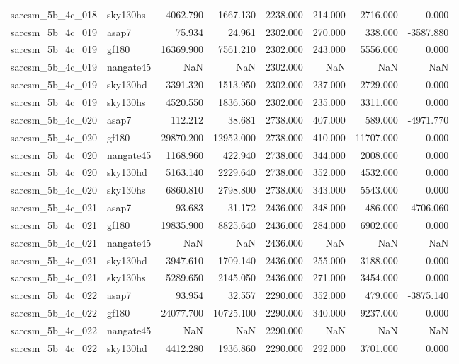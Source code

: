 \begin{tabular}{llrrrrrr}
sarcsm\_5b\_4c\_018 & sky130hs & 4062.790 & 1667.130 & 2238.000 & 214.000 & 2716.000 & 0.000 \\
sarcsm\_5b\_4c\_019 & asap7 & 75.934 & 24.961 & 2302.000 & 270.000 & 338.000 & -3587.880 \\
sarcsm\_5b\_4c\_019 & gf180 & 16369.900 & 7561.210 & 2302.000 & 243.000 & 5556.000 & 0.000 \\
sarcsm\_5b\_4c\_019 & nangate45 & NaN & NaN & 2302.000 & NaN & NaN & NaN \\
sarcsm\_5b\_4c\_019 & sky130hd & 3391.320 & 1513.950 & 2302.000 & 237.000 & 2729.000 & 0.000 \\
sarcsm\_5b\_4c\_019 & sky130hs & 4520.550 & 1836.560 & 2302.000 & 235.000 & 3311.000 & 0.000 \\
sarcsm\_5b\_4c\_020 & asap7 & 112.212 & 38.681 & 2738.000 & 407.000 & 589.000 & -4971.770 \\
sarcsm\_5b\_4c\_020 & gf180 & 29870.200 & 12952.000 & 2738.000 & 410.000 & 11707.000 & 0.000 \\
sarcsm\_5b\_4c\_020 & nangate45 & 1168.960 & 422.940 & 2738.000 & 344.000 & 2008.000 & 0.000 \\
sarcsm\_5b\_4c\_020 & sky130hd & 5163.140 & 2229.640 & 2738.000 & 352.000 & 4532.000 & 0.000 \\
sarcsm\_5b\_4c\_020 & sky130hs & 6860.810 & 2798.800 & 2738.000 & 343.000 & 5543.000 & 0.000 \\
sarcsm\_5b\_4c\_021 & asap7 & 93.683 & 31.172 & 2436.000 & 348.000 & 486.000 & -4706.060 \\
sarcsm\_5b\_4c\_021 & gf180 & 19835.900 & 8825.640 & 2436.000 & 284.000 & 6902.000 & 0.000 \\
sarcsm\_5b\_4c\_021 & nangate45 & NaN & NaN & 2436.000 & NaN & NaN & NaN \\
sarcsm\_5b\_4c\_021 & sky130hd & 3947.610 & 1709.140 & 2436.000 & 255.000 & 3188.000 & 0.000 \\
sarcsm\_5b\_4c\_021 & sky130hs & 5289.650 & 2145.050 & 2436.000 & 271.000 & 3454.000 & 0.000 \\
sarcsm\_5b\_4c\_022 & asap7 & 93.954 & 32.557 & 2290.000 & 352.000 & 479.000 & -3875.140 \\
sarcsm\_5b\_4c\_022 & gf180 & 24077.700 & 10725.100 & 2290.000 & 340.000 & 9237.000 & 0.000 \\
sarcsm\_5b\_4c\_022 & nangate45 & NaN & NaN & 2290.000 & NaN & NaN & NaN \\
sarcsm\_5b\_4c\_022 & sky130hd & 4412.280 & 1936.860 & 2290.000 & 292.000 & 3701.000 & 0.000 \\

\end{tabular}
